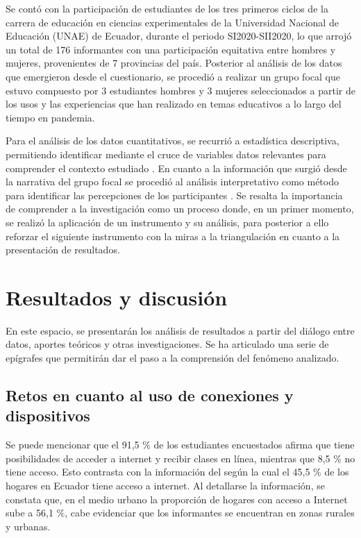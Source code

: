 \documentclass{textolivre}
\begin{document}
Se contó con la participación de estudiantes de los tres primeros ciclos de la carrera de educación en ciencias experimentales de la Universidad Nacional de Educación (UNAE) de Ecuador, durante el periodo SI2020-SII2020, lo que arrojó un total de 176 informantes con una participación equitativa entre hombres y mujeres, provenientes de 7 provincias del país. Posterior al análisis de los datos que emergieron desde el cuestionario, se procedió a realizar un grupo focal que estuvo compuesto por 3 estudiantes hombres y 3 mujeres seleccionados a partir de los usos y las experiencias que han realizado en temas educativos a lo largo del tiempo en pandemia. 

Para el análisis de los datos cuantitativos, se recurrió a estadística descriptiva, permitiendo identificar mediante el cruce de variables datos relevantes para comprender el contexto estudiado \cite{ordonez_pinzon_estudio_2006}. En cuanto a la información que surgió desde la narrativa del grupo focal se procedió al análisis interpretativo como método para identificar las percepciones de los participantes \cite{onwuegbuzie_marco_2011}. Se resalta la importancia de comprender a la investigación como un proceso donde, en un primer momento, se realizó la aplicación de un instrumento y su análisis,  para posterior a ello reforzar el siguiente instrumento con la miras a la triangulación en cuanto a la presentación de resultados. 

\section{Resultados y discusión}\label{sec-conduta}
En este espacio, se presentarán los análisis de resultados a partir del diálogo entre datos, aportes teóricos y otras investigaciones. Se ha articulado una serie de epígrafes que permitirán dar el paso a la comprensión del fenómeno analizado. 

\subsection{Retos en cuanto al uso de conexiones y dispositivos}\label{sec-fmt-manuscrito}
Se puede mencionar que el 91,5 \% de los estudiantes encuestados afirma que tiene posibilidades de acceder a internet y recibir clases en línea, mientras que 8,5 \% no tiene acceso. Esto contrasta con la información del \textcite{instituto_nacional_de_estadisticas_y_censos_de_ecuador_[inec]_encuesta_2020} según la cual el 45,5 \% de los hogares en Ecuador tiene acceso a internet. Al detallarse la información, se constata que, en el medio urbano la proporción de hogares con acceso a Internet sube a 56,1 \%, cabe evidenciar que los informantes se encuentran en zonas rurales y urbanas. 
\end{document}
